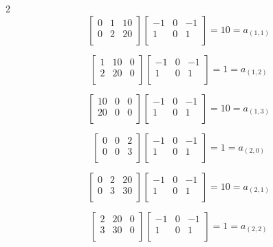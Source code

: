 \documentclass[11pt]{article}
\theoremstyle{plain}
\begin{document}
\begin{multicols}{2}
\[
	\begin{bmatrix}
		0 & 1 & 10 \\
		0 & 2 & 20 \\
	\end{bmatrix}
	\begin{bmatrix}
		-1 & 0 & -1 \\
		1  & 0 & 1  \\
	\end{bmatrix}
	= 10 = a_{(1,1)}
\]

\[
	\begin{bmatrix}
		1 & 10 & 0 \\
		2 & 20 & 0 \\
	\end{bmatrix}
	\begin{bmatrix}
		-1 & 0 & -1 \\
		1  & 0 & 1  \\
	\end{bmatrix}
	= 1 = a_{(1,2)}
\]

\[
	\begin{bmatrix}
		10 & 0 & 0 \\
		20 & 0 & 0 \\
	\end{bmatrix}
	\begin{bmatrix}
		-1 & 0 & -1 \\
		1  & 0 & 1  \\
	\end{bmatrix}
	= 10 = a_{(1,3)}
\]

\[
	\begin{bmatrix}
		0 & 0 & 2 \\
		0 & 0 & 3 \\
	\end{bmatrix}
	\begin{bmatrix}
		-1 & 0 & -1 \\
		1  & 0 & 1  \\
	\end{bmatrix}
	= 1 = a_{(2,0)}
\]

\[
	\begin{bmatrix}
		0 & 2 & 20 \\
		0 & 3 & 30 \\
	\end{bmatrix}
	\begin{bmatrix}
		-1 & 0 & -1 \\
		1  & 0 & 1  \\
	\end{bmatrix}
	= 10 = a_{(2,1)}
\]

\[
	\begin{bmatrix}
		2 & 20 & 0 \\
		3 & 30 & 0 \\
	\end{bmatrix}
	\begin{bmatrix}
		-1 & 0 & -1 \\
		1  & 0 & 1  \\
	\end{bmatrix}
	= 1 = a_{(2,2)}
\]


\end{multicols}
\end{document}
